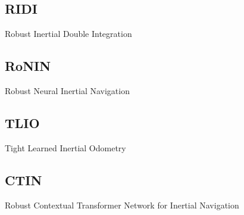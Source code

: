 \subsection{RIDI}
Robust Inertial Double Integration

\subsection{RoNIN}
Robust Neural Inertial Navigation

\subsection{TLIO}
Tight Learned Inertial Odometry

\subsection{CTIN}
Robust Contextual Transformer Network for Inertial Navigation



